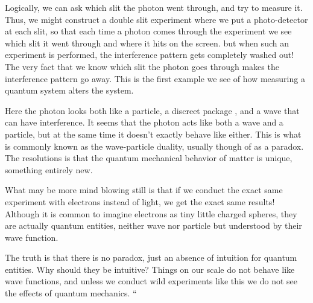 Logically, we can ask which slit the photon went through, and try to measure it. Thus, we might construct a double slit experiment where we put a photo-detector at each slit, so that each time a photon comes through the experiment we see which slit it went through and where it hits on the screen. but when such an experiment is performed, the interference pattern gets completely washed out! The very fact that we know which slit the photon goes through makes the interference pattern go away. This is the first example we see of how measuring a quantum system alters the system.

Here the photon looks both like a particle, a discreet package , and a wave that can have interference. It seems that the photon acts like both a wave and a particle, but at the same time it doesn't exactly behave like either. This is what is commonly known as the wave-particle duality, usually though of as a paradox. The resolutions is that the quantum mechanical behavior of matter is unique, something entirely new.

What may be more mind blowing still is that if we conduct the exact same experiment with electrons instead of light, we get the exact same results! Although it is common to imagine electrons as tiny little charged spheres, they are actually quantum entities, neither wave nor particle but understood by their wave function.

The truth is that there is no paradox, just an absence of intuition for quantum entities. Why should they be intuitive? Things on our scale do not behave like wave functions, and unless we conduct wild experiments like this we do not see the effects of quantum mechanics.
``  
